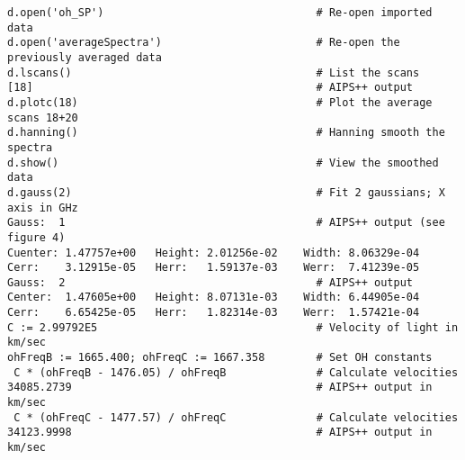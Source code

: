 
\begin{verbatim}
d.open('oh_SP')                                 # Re-open imported data
d.open('averageSpectra')                        # Re-open the previously averaged data
d.lscans()                                      # List the scans
[18]                                            # AIPS++ output
d.plotc(18)                                     # Plot the average scans 18+20
d.hanning()                                     # Hanning smooth the spectra
d.show()                                        # View the smoothed data
d.gauss(2)                                      # Fit 2 gaussians; X axis in GHz 
Gauss:  1                                       # AIPS++ output (see figure 4) 
Cuenter: 1.47757e+00   Height: 2.01256e-02    Width: 8.06329e-04
Cerr:    3.12915e-05   Herr:   1.59137e-03    Werr:  7.41239e-05
Gauss:  2                                       # AIPS++ output
Center:  1.47605e+00   Height: 8.07131e-03    Width: 6.44905e-04
Cerr:    6.65425e-05   Herr:   1.82314e-03    Werr:  1.57421e-04
C := 2.99792E5                                  # Velocity of light in km/sec  
ohFreqB := 1665.400; ohFreqC := 1667.358        # Set OH constants 
 C * (ohFreqB - 1476.05) / ohFreqB              # Calculate velocities 
34085.2739                                      # AIPS++ output in km/sec
 C * (ohFreqC - 1477.57) / ohFreqC              # Calculate velocities 
34123.9998                                      # AIPS++ output in km/sec
\end{verbatim}
